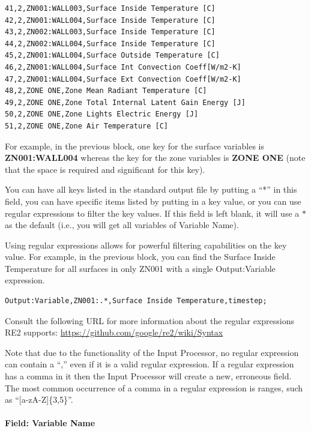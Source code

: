 \begin{lstlisting}
41,2,ZN001:WALL003,Surface Inside Temperature [C]
42,2,ZN001:WALL004,Surface Inside Temperature [C]
43,2,ZN002:WALL003,Surface Inside Temperature [C]
44,2,ZN002:WALL004,Surface Inside Temperature [C]
45,2,ZN001:WALL004,Surface Outside Temperature [C]
46,2,ZN001:WALL004,Surface Int Convection Coeff[W/m2-K]
47,2,ZN001:WALL004,Surface Ext Convection Coeff[W/m2-K]
48,2,ZONE ONE,Zone Mean Radiant Temperature [C]
49,2,ZONE ONE,Zone Total Internal Latent Gain Energy [J]
50,2,ZONE ONE,Zone Lights Electric Energy [J]
51,2,ZONE ONE,Zone Air Temperature [C]
\end{lstlisting}

For example, in the previous block, one key for the surface variables is \textbf{ZN001:WALL004} whereas the key for the zone variables is \textbf{ZONE ONE} (note that the space is required and significant for this key).

You can have all keys listed in the standard output file by putting a ``*'' in this field, you can have specific items listed by putting in a key value, or you can use regular expressions to filter the key values. If this field is left blank, it will use a $*$ as the default (i.e., you will get all variables of Variable Name).

Using regular expressions allows for powerful filtering capabilities on the key value. For example, in the previous block, you can find the Surface Inside Temperature for all surfaces in only ZN001 with a single Output:Variable expression.

\begin{lstlisting}
Output:Variable,ZN001:.*,Surface Inside Temperature,timestep;
\end{lstlisting}

Consult the following URL for more information about the regular expressions RE2 supports: \url{https://github.com/google/re2/wiki/Syntax}

Note that due to the functionality of the Input Processor, no regular expression can contain a ``,'' even if it is a valid regular expression. If a regular expression has a comma in it then the Input Processor will create a new, erroneous field. The most common occurrence of a comma in a regular expression is ranges, such as ``[a-zA-Z]\{3,5\}''.

\paragraph{Field: Variable Name}\label{field-variable-name}

